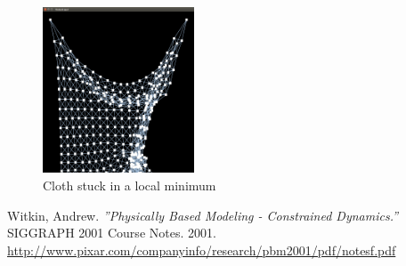 \documentclass[a4paper,twoside,11pt,twocolumn]{article}
\begin{document}
\begin{figure}[h]
	\includegraphics[width=0.4\textwidth]{diag_localmin}
	\caption{Cloth stuck in a local minimum}
	\label{diag_localmin}
\end{figure}


\begin{thebibliography}{9}
 Witkin, Andrew. \emph{''Physically Based Modeling - Constrained Dynamics.''} SIGGRAPH 2001 Course Notes. 2001. \url{http://www.pixar.com/companyinfo/research/pbm2001/pdf/notesf.pdf}
\end{thebibliography}
\end{document}
